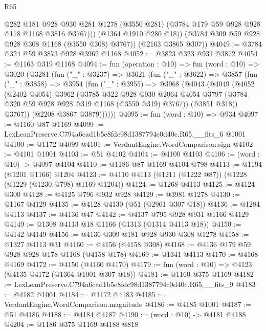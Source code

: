 \begin{lexlean}{R65}
\begin{coremodule}
              @282
              @181
              @928
              @930
              @281
              @1278
              (@3550 @281)
              (@3784 @179 @59 @928 @928 @178 @1168 @3816 @3767)))
          (@1364 @1910 @280 @18))
        (@3784 @309 @59 @928 @928 @308 @1168 (@3550 @308) @3767))
      (@2163 @3865 @307))
@4049 := @3784 @324 @59 @3873 @928 @3962 @1168
@4052 := @3823 @323 @931 @3872
@4054 := @1163 @319 @1168
@4094 := fun (operation : @10) =>
  fun (word : @10) =>
  @3020
    (@3281
      (fun ("_" : @3237) =>
      @3621
        (fun ("_" : @3622) =>
        @3857
          (fun ("_" : @3858) =>
          @3954
            (fun ("_" : @3955) =>
            @3968
              (@4043
                (@4049
                  (@4052
                    (@2402 @4054)
                    @3962
                    (@3785
                      @322
                      @928
                      @930
                      @2064
                      @4054
                      @3797
                      (@3784 @320 @59 @928 @928 @319 @1168 (@3550 @319) @3767))
                    (@3851 @318))
                  @3767))
              (@2208 @3867 @3879))))))
@4095 := fun (word : @10) => @934
@4097 := @1160 @87 @1169
@4099 := LexLeanPreserve.C794a6cad1b5e8fdc98d1387794c0d40c.R65.__fits_6 @1001
@4100 := @1172 @4099
@4101 := VerdantEngine.WordComparison.sign
@4102 := @4101 @1001
@4103 := @51 @4102
@4104 := @4100 @4103
@4106 := (word : @10) -> @4097 @4104
@4110 := @1186 @87 @1169 @4104 @798
@4113 := @1194 (@1201 @1166) @1204
@4123 := @4110 @4113 (@1211 (@1222 @87)) (@1228 (@1229 (@1230 @798) @1169 @1204))
@4124 := @1268 @4113
@4125 := @4124 @300
@4128 := @4125 @796 @932 @928
@4129 := @3981 @1278
@4130 := @1167 @4129
@4135 := @4128 @4130 (@51 (@2961 @307 @18))
@4136 := @1284 @4113
@4137 := @4136 @47
@4142 := @4137 @795 @928 @931 @1166 @4129
@4149 := @1308 @4113 @18 @1166 (@1313 (@1314 @4113 @18))
@4150 := @4142 @4149
@4156 := @4136 @309 @181 @928 @930 @308 @1278
@4158 := @1327 @4113 @31
@4160 := @4156 (@4158 @308)
@4168 := @4136 @179 @59 @928 @928 @178 @1168 (@4158 @178)
@4169 := @1341 @4113
@4170 := @4168 @4169
@4172 := @4150 (@4160 @4170)
@4179 := fun (word : @10) => @4123 (@4135 @4172 (@1364 @1001 @307 @18))
@4181 := @1160 @375 @1169
@4182 := LexLeanPreserve.C794a6cad1b5e8fdc98d1387794c0d40c.R65.__fits_9
@4183 := @4182 @1001
@4184 := @1172 @4183
@4185 := VerdantEngine.WordComparison.magnitude
@4186 := @4185 @1001
@4187 := @51 @4186
@4188 := @4184 @4187
@4190 := (word : @10) -> @4181 @4188
@4204 := @1186
    @375
    @1169
    @4188
    @818

\end{coremodule}
\end{lexlean}
